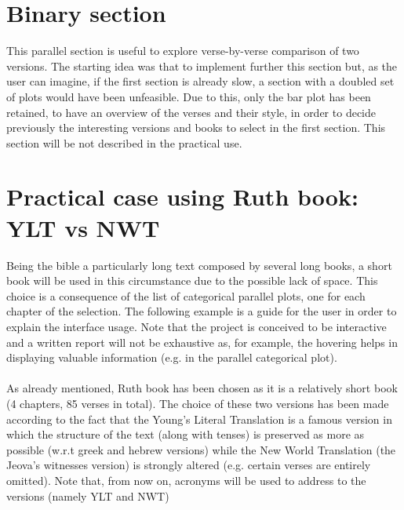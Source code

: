 \documentclass[sigchi]{article}
\begin{document}
\section{Binary section}
This parallel section is useful to explore verse-by-verse comparison of two versions. The starting idea was that to implement further this section but, as the user can imagine, if the first section is already slow, a section with a doubled set of plots would have been unfeasible. Due to this, only the bar plot has been retained, to have an overview of the verses and their style, in order to decide previously the interesting versions and books to select in the first section. This section will be not described in the practical use.

\section{Practical case using Ruth book: YLT vs NWT}
Being the bible a particularly long text composed by several long books, a short book will be used in this circumstance due to the possible lack of space. This choice is a consequence of the list of categorical parallel plots, one for each chapter of the selection. The following example is a guide for the user in order to explain the interface usage. Note that the project is conceived to be interactive and a written report will not be exhaustive as, for example, the hovering helps in displaying valuable information (e.g. in the parallel categorical plot).\\ \\
As already mentioned, Ruth book has been chosen as it is a relatively short book (4 chapters, 85 verses in total). The choice of these two versions has been made according to the fact that the Young’s Literal Translation is a famous version in which the structure of the text (along with tenses) is preserved as more as possible (w.r.t greek and hebrew versions) while the New World Translation (the Jeova’s witnesses version) is strongly altered (e.g. certain verses are entirely omitted). Note that, from now on, acronyms will be used to address to the versions (namely YLT and NWT)
\end{document}
